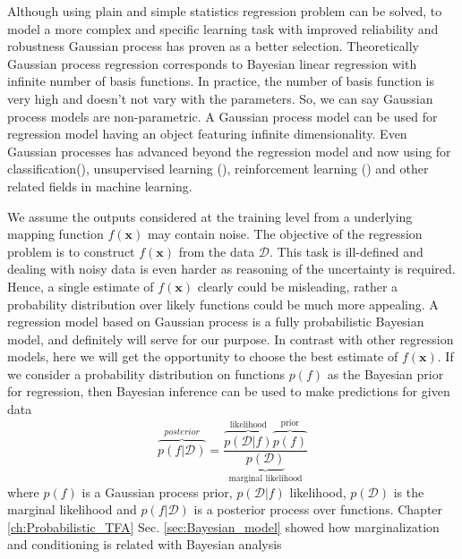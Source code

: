 Although using plain and simple statistics regression problem can be solved, to model a more complex and specific learning task with improved reliability and robustness Gaussian process has proven as a better selection. Theoretically Gaussian process regression corresponds to Bayesian linear regression with infinite number of basis functions. In practice, the number of basis function is very high and doesn't not vary with the parameters. So, we can say Gaussian process models are non-parametric. A Gaussian process model can be used for regression model having an object featuring infinite dimensionality. Even Gaussian processes has advanced beyond the regression model and now using for classification(\cite{Williams:1998, Nickisch:2008}), unsupervised learning (\cite{Ek:2008}), reinforcement learning (\cite{Deisenroth:2012}) and other related fields in machine learning.

We assume the outputs considered at the training level from a underlying mapping function $f(\textbf{x})$ may contain noise. The objective of the regression problem is to construct $f(\textbf{x})$ from the data $\mathcal{D}$. This task is ill-defined and dealing with noisy data is even harder as reasoning of the uncertainty is required. Hence, a single estimate of $f(\textbf{x})$ clearly could be misleading, rather a probability distribution over likely functions could be much more appealing. A regression model based on Gaussian process is a fully probabilistic Bayesian model, and definitely will serve for our purpose. In contrast with other regression models, here we will get the opportunity to choose the best estimate of $f(\textbf{x})$. If we consider a probability distribution on functions $p(f)$ as the Bayesian prior for regression, then Bayesian inference can be used to make predictions for given data 
\begin{equation} \label{eq:2.1}
\overbrace{p\left(f|\mathcal{D}\right)}^{posterior}= \frac{\overbrace{p\left(\mathcal{D}|f\right)}^{\text{likelihood}}\overbrace{p\left(f\right)}^{\text {prior}}}{\underbrace{p\left(\mathcal{D}\right)}_{\text {marginal likelihood}}} 
\end{equation}
where $p\left(f\right)$ is a Gaussian process prior, $p\left(\mathcal{D}|f\right)$ likelihood, $p\left(\mathcal{D}\right)$ is the marginal likelihood and $p\left(f|\mathcal{D}\right)$ is a posterior process over functions. Chapter \ref{ch:Probabilistic_TFA} Sec. \ref{sec:Bayesian_model} showed how marginalization and conditioning is related with Bayesian analysis


